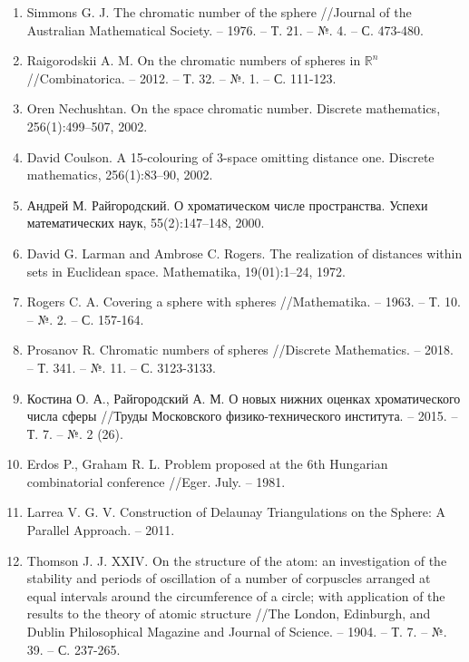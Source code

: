 \begin{enumerate}[leftmargin=0.5cm,topsep=0pt,itemsep=-1ex,partopsep=1ex,parsep=1ex,ref=\arabic{*},label=\arabic{*}.]
\item\label{bib:Simmons}
Simmons G. J. The chromatic number of the sphere //Journal of the Austra\-li\-an Mathematical Society. – 1976. – Т. 21. – №. 4. – С. 473-480.

\item\label{bib:RaiSphere}
Raigorodskii A. M. On the chromatic numbers of spheres in $\mathbb{R}^n$ //Combinato\-ri\-ca. – 2012. – Т. 32. – №. 1. – С. 111-123.

\item\label{bib:Nech}
Oren Nechushtan. On the space chromatic number. Discrete mathematics, 256(1):499–507, 2002.

\item\label{bib:Coul}
David Coulson. A 15-colouring of 3-space omitting distance one. Discrete mathematics, 256(1):83–90, 2002.

\item\label{bib:Rai1}
Андрей М. Райгородский. О хроматическом числе пространства. Успехи математических наук, 55(2):147–148, 2000.

\item\label{bib:Larm}
David G. Larman and Ambrose C. Rogers. The realization of distances within sets in Euclidean space. Mathematika, 19(01):1–24, 1972. 

\item\label{bib:Rogers}
Rogers C. A. Covering a sphere with spheres //Mathematika. – 1963. – Т. 10. – №. 2. – С. 157-164.

\item\label{bib:Pros}
Prosanov R. Chromatic numbers of spheres //Discrete Mathematics. – 2018. – Т. 341. – №. 11. – С. 3123-3133.

\item\label{bib:Kostina}
Костина О. А., Райгородский А. М. О новых нижних оценках хроматического числа сферы //Труды Московского физико-технического института. – 2015. – Т. 7. – №. 2 (26).

\item\label{bib:ErdosGraham}
Erdos P., Graham R. L. Problem proposed at the 6th Hungarian combinato\-ri\-al conference //Eger. July. – 1981.

\item\label{bib:Larrea}
Larrea V. G. V. Construction of Delaunay Triangulations on the Sphere: A Parallel Approach. – 2011.

\item\label{bib:Thomson}
Thomson J. J. XXIV. On the structure of the atom: an investigation of the stability and periods of oscillation of a number of corpuscles arranged at equal intervals around the circumference of a circle; with application of the results to the theory of atomic structure //The London, Edinburgh, and Dublin Philosophical Magazine and Journal of Science. – 1904. – Т. 7. – №. 39. – С. 237-265.


\end{enumerate}

